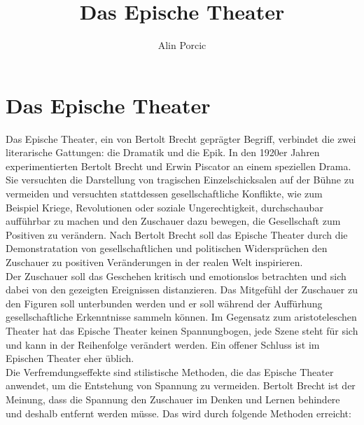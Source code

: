 \documentclass[a4paper]{article}
\title{Das Epische Theater}
\author{Alin Porcic}
\begin{document}
\maketitle
\newpage

	\section{Das Epische Theater}

        Das Epische Theater, ein von Bertolt Brecht geprägter Begriff, verbindet die zwei literarische Gattungen: die Dramatik und die Epik. In den 1920er Jahren experimentierten Bertolt Brecht und Erwin Piscator an einem speziellen  Drama. Sie versuchten die Darstellung von tragischen Einzelschicksalen auf der Bühne zu vermeiden und versuchten stattdessen gesellschaftliche Konflikte, wie zum Beispiel Kriege, Revolutionen oder soziale Ungerechtigkeit, durchschaubar aufführbar zu machen und den Zuschauer dazu bewegen, die Gesellschaft zum Positiven zu verändern. Nach Bertolt Brecht soll das Epische Theater durch die Demonstratation von gesellschaftlichen und politischen Widersprüchen den Zuschauer zu positiven Veränderungen in der realen Welt inspirieren.\\
        
        Der Zuschauer soll das Geschehen kritisch und emotionslos betrachten und sich dabei von den gezeigten Ereignissen distanzieren. Das Mitgefühl der Zuschauer zu den Figuren soll unterbunden werden und er soll während der Auffürhung gesellschaftliche Erkenntnisse sammeln können. Im Gegensatz zum aristoteleschen Theater hat das Epische Theater keinen Spannungbogen, jede Szene steht für sich und kann in der Reihenfolge verändert werden. Ein offener Schluss ist im Epischen Theater eher üblich.\\
        
        Die Verfremdungseffekte sind stilistische Methoden, die das Epische Theater anwendet, um die Entstehung von Spannung zu vermeiden. Bertolt Brecht ist der Meinung, dass die Spannung den Zuschauer im Denken und Lernen behindere und deshalb entfernt werden müsse. Das wird durch folgende Methoden erreicht:
        
\end{document}
